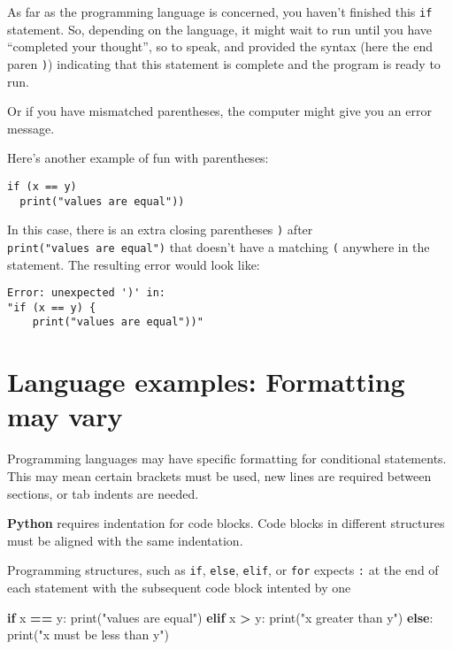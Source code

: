 \documentclass[
]{book}
\newenvironment{Shaded}{\begin{snugshade}}{\end{snugshade}}
\newcommand{\BuiltInTok}[1]{#1}
\newcommand{\ControlFlowTok}[1]{\textcolor[rgb]{0.13,0.29,0.53}{\textbf{#1}}}
\newcommand{\NormalTok}[1]{#1}
\newcommand{\OperatorTok}[1]{\textcolor[rgb]{0.81,0.36,0.00}{\textbf{#1}}}
\newcommand{\StringTok}[1]{\textcolor[rgb]{0.31,0.60,0.02}{#1}}
\begin{document}
As far as the programming language is concerned, you haven't finished this \texttt{if} statement. So, depending on the language, it might wait to run until you have ``completed your thought'', so to speak, and provided the syntax (here the end paren \texttt{)}) indicating that this statement is complete and the program is ready to run.

Or if you have mismatched parentheses, the computer might give you an error message.

Here's another example of fun with parentheses:

\begin{verbatim}
if (x == y) 
  print("values are equal"))
\end{verbatim}

In this case, there is an extra closing parentheses \texttt{)} after \texttt{print("values\ are\ equal")} that doesn't have a matching \texttt{(} anywhere in the statement. The resulting error would look like:

\begin{verbatim}
Error: unexpected ')' in:
"if (x == y) {
    print("values are equal"))"
\end{verbatim}

\section{Language examples: Formatting may vary}\label{language-examples-formatting-may-vary}

Programming languages may have specific formatting for conditional statements. This may mean certain brackets must be used, new lines are required between sections, or tab indents are needed.

\textbf{Python} requires indentation for code blocks. Code blocks in different structures must be aligned with the same indentation.

Programming structures, such as \texttt{if}, \texttt{else}, \texttt{elif}, or \texttt{for} expects \texttt{:} at the end of each statement with the subsequent code block intented by one

\begin{Shaded}
\begin{Highlighting}[]
\ControlFlowTok{if}\NormalTok{ x }\OperatorTok{==}\NormalTok{ y:}
  \BuiltInTok{print}\NormalTok{(}\StringTok{"values are equal"}\NormalTok{)}
\ControlFlowTok{elif}\NormalTok{ x }\OperatorTok{\textgreater{}}\NormalTok{ y:}
  \BuiltInTok{print}\NormalTok{(}\StringTok{"x greater than y"}\NormalTok{)}
\ControlFlowTok{else}\NormalTok{:}
  \BuiltInTok{print}\NormalTok{(}\StringTok{"x must be less than y"}\NormalTok{)}
\end{Highlighting}
\end{Shaded}
\end{document}
